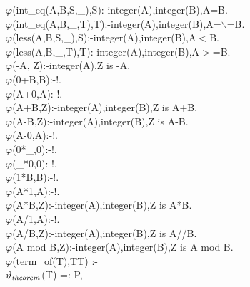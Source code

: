 \documentclass[11pt]{report}
\begin{document}
\begin{sf}
\begin{tabbing}
$\varphi$(int\_\hspace{0.1em}eq(A,B,S,\_\hspace{0.1em}),S):-integer(A),integer(B),A=B.\\[-0.15ex]
$\varphi$(int\_\hspace{0.1em}eq(A,B,\_\hspace{0.1em},T),T):-integer(A),integer(B),A=$\backslash$=B.\\[-0.15ex]
$\varphi$(less(A,B,S,\_\hspace{0.1em}),S):-integer(A),integer(B),A$<$B.\\[-0.15ex]
$\varphi$(less(A,B,\_\hspace{0.1em},T),T):-integer(A),integer(B),A$>$=B.\\[-0.15ex]
$\varphi$(-A, Z):-integer(A),Z is -A.\\[-0.15ex]
$\varphi$(0+B,B):-!.\\[-0.15ex]
$\varphi$(A+0,A):-!.\\[-0.15ex]
$\varphi$(A+B,Z):-integer(A),integer(B),Z is A+B.\\[-0.15ex]
$\varphi$(A-B,Z):-integer(A),integer(B),Z is A-B.\\[-0.15ex]
$\varphi$(A-0,A):-!.\\[-0.15ex]
$\varphi$(0*\_\hspace{0.1em},0):-!.\\[-0.15ex]
$\varphi$(\_\hspace{0.1em}*0,0):-!.\\[-0.15ex]
$\varphi$(1*B,B):-!.\\[-0.15ex]
$\varphi$(A*1,A):-!.\\[-0.15ex]
$\varphi$(A*B,Z):-integer(A),integer(B),Z is A*B.\\[-0.15ex]
$\varphi$(A/1,A):-!.\\[-0.15ex]
$\varphi$(A/B,Z):-integer(A),integer(B),Z is A//B.\\[-0.15ex]
$\varphi$(A mod B,Z):-integer(A),integer(B),Z is A mod B.\\[-0.15ex]
$\varphi$(term\_\hspace{0.1em}of(T),TT) :-\\[-0.15ex]
\hspace{2em}$\vartheta_{\it theorem}$(T) =: P,
\end{tabbing}\end{sf}
\end{document}
